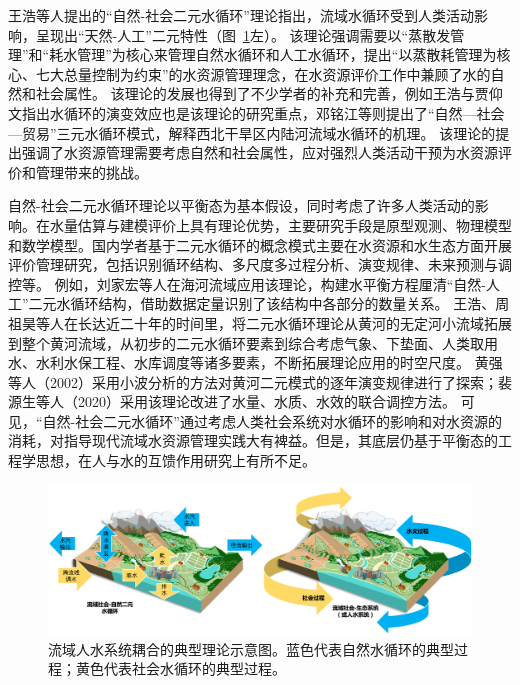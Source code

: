 王浩等人提出的“自然-社会二元水循环”理论指出，流域水循环受到人类活动影响，呈现出“天然-人工”二元特性\cite{wang2006}（图~\ref{ch1:fig:two_water_cycle}左）。
该理论强调需要以“蒸散发管理”和“耗水管理”为核心来管理自然水循环和人工水循环，提出“以蒸散耗管理为核心、七大总量控制为约束”的水资源管理理念，在水资源评价工作中兼顾了水的自然和社会属性\cite{wang2010}。
该理论的发展也得到了不少学者的补充和完善，例如王浩与贾仰文指出水循环的演变效应也是该理论的研究重点\cite{wang2016}，邓铭江等则提出了“自然—社会—贸易”三元水循环模式，解释西北干旱区内陆河流域水循环的机理\cite{deng2020}。
该理论的提出强调了水资源管理需要考虑自然和社会属性，应对强烈人类活动干预为水资源评价和管理带来的挑战。

自然-社会二元水循环理论以平衡态为基本假设，同时考虑了许多人类活动的影响。在水量估算与建模评价上具有理论优势，主要研究手段是原型观测、物理模型和数学模型。国内学者基于二元水循环的概念模式主要在水资源和水生态方面开展评价管理研究，包括识别循环结构、多尺度多过程分析、演变规律、未来预测与调控等\cite{wang2016}。
例如，刘家宏等人在海河流域应用该理论，构建水平衡方程厘清“自然-人工”二元水循环结构，借助数据定量识别了该结构中各部分的数量关系\cite{liu2010}。
王浩\cite{wang2004}、周祖昊\cite{zhou2022a}等人在长达近二十年的时间里，将二元水循环理论从黄河的无定河小流域拓展到整个黄河流域，从初步的二元水循环要素到综合考虑气象、下垫面、人类取用水、水利水保工程、水库调度等诸多要素，不断拓展理论应用的时空尺度。
黄强等人（2002）采用小波分析的方法对黄河二元模式的逐年演变规律进行了探索\cite{huang2002}；裴源生等人（2020）采用该理论改进了水量、水质、水效的联合调控方法\cite{pei2020}。
可见，“自然-社会二元水循环”通过考虑人类社会系统对水循环的影响和对水资源的消耗，对指导现代流域水资源管理实践大有裨益。但是，其底层仍基于平衡态的工程学思想，在人与水的互馈作用研究上有所不足。

\begin{figure}[htb]
    \centering
    \includegraphics[width=\textwidth]{img/ch1/ch1_two_water_cycle.png}
    \caption[流域人水耦合系统的典型理论示意图]{流域人水系统耦合的典型理论示意图\cite{wang2006,dibaldassarre2015}。蓝色代表自然水循环的典型过程；黄色代表社会水循环的典型过程。}\label{ch1:fig:two_water_cycle}
\end{figure}

